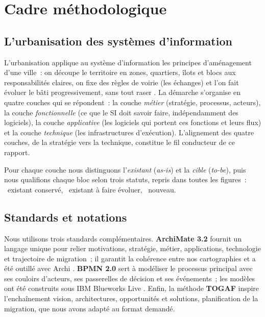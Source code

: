 \section{Cadre méthodologique}
\label{sec:methodo}

\subsection{L'urbanisation des systèmes d'information}
L'urbanisation applique au système d'information les principes d'aménagement d'une ville~: on découpe le territoire en zones, quartiers, îlots et blocs aux responsabilités claires, on fixe des règles de voirie (les échanges) et l'on fait évoluer le bâti progressivement, sans tout raser \cite{longepe2009, club_urba2010}. La démarche s'organise en quatre couches qui se répondent~: la couche \emph{métier} (stratégie, processus, acteurs), la couche \emph{fonctionnelle} (ce que le SI doit savoir faire, indépendamment des logiciels), la couche \emph{applicative} (les logiciels qui portent ces fonctions et leurs flux) et la couche \emph{technique} (les infrastructures d'exécution). L'alignement des quatre couches, de la stratégie vers la technique, constitue le fil conducteur de ce rapport.

Pour chaque couche nous distinguons l'\emph{existant} (\emph{as-is}) et la \emph{cible} (\emph{to-be}), puis nous qualifions chaque bloc selon trois statuts, repris dans toutes les figures~: \tagE~existant conservé, \tagV~existant à faire évoluer, \tagN~nouveau.

\subsection{Standards et notations}
Nous utilisons trois standards complémentaires. \textbf{ArchiMate 3.2} \cite{archimate32} fournit un langage unique pour relier motivations, stratégie, métier, applications, technologie et trajectoire de migration~; il garantit la cohérence entre nos cartographies et a été outillé avec Archi \cite{archi_tool}. \textbf{BPMN 2.0} \cite{bpmn20} sert à modéliser le processus principal avec ses couloirs d'acteurs, ses passerelles de décision et ses événements~; les modèles ont été construits sous IBM Blueworks Live \cite{blueworks_doc}. Enfin, la méthode \textbf{TOGAF} \cite{togaf10} inspire l'enchaînement vision, architectures, opportunités et solutions, planification de la migration, que nous avons adapté au format demandé.

